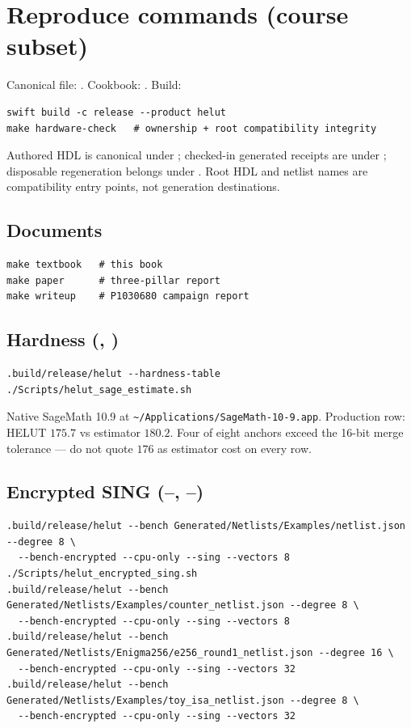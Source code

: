 \chapter{Reproduce commands (course subset)}
\label{app:repro}

Canonical file: .
Cookbook: .
Build:

\begin{lstlisting}
swift build -c release --product helut
make hardware-check   # ownership + root compatibility integrity
\end{lstlisting}

Authored HDL is canonical under ; checked-in generated
receipts are under ; disposable regeneration belongs under
. Root HDL and netlist names are compatibility entry
points, not generation destinations.

\section{Documents}

\begin{lstlisting}
make textbook   # this book
make paper      # three-pillar report
make writeup    # P1030680 campaign report
\end{lstlisting}

\section{Hardness (, )}

\begin{lstlisting}
.build/release/helut --hardness-table
./Scripts/helut_sage_estimate.sh
\end{lstlisting}

Native SageMath 10.9 at \texttt{\textasciitilde/Applications/SageMath-10-9.app}.
Production row: HELUT $175.7$ vs estimator $180.2$.
Four of eight anchors exceed the 16-bit merge tolerance --- do not quote
$176$ as estimator cost on every row.

\section{Encrypted SING (--, --)}

\begin{lstlisting}
.build/release/helut --bench Generated/Netlists/Examples/netlist.json --degree 8 \
  --bench-encrypted --cpu-only --sing --vectors 8
./Scripts/helut_encrypted_sing.sh
.build/release/helut --bench Generated/Netlists/Examples/counter_netlist.json --degree 8 \
  --bench-encrypted --cpu-only --sing --vectors 8
.build/release/helut --bench Generated/Netlists/Enigma256/e256_round1_netlist.json --degree 16 \
  --bench-encrypted --cpu-only --sing --vectors 32
.build/release/helut --bench Generated/Netlists/Examples/toy_isa_netlist.json --degree 8 \
  --bench-encrypted --cpu-only --sing --vectors 32
\end{lstlisting}

